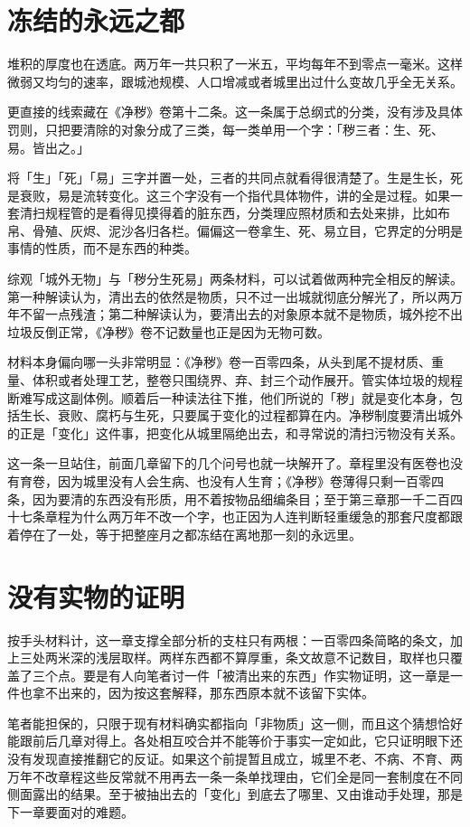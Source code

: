 \section{冻结的永远之都}

堆积的厚度也在透底。两万年一共只积了一米五，平均每年不到零点一毫米。这样微弱又均匀的速率，跟城池规模、人口增减或者城里出过什么变故几乎全无关系。

更直接的线索藏在《净秽》卷第十二条。这一条属于总纲式的分类，没有涉及具体罚则，只把要清除的对象分成了三类，每一类单用一个字：「秽三者：生、死、易。皆出之。」

将「生」「死」「易」三字并置一处，三者的共同点就看得很清楚了。生是生长，死是衰败，易是流转变化。这三个字没有一个指代具体物件，讲的全是过程。如果一套清扫规程管的是看得见摸得着的脏东西，分类理应照材质和去处来排，比如布帛、骨殖、灰烬、泥沙各归各栏。偏偏这一卷拿生、死、易立目，它界定的分明是事情的性质，而不是东西的种类。

综观「城外无物」与「秽分生死易」两条材料，可以试着做两种完全相反的解读。第一种解读认为，清出去的依然是物质，只不过一出城就彻底分解光了，所以两万年不留一点残渣；第二种解读认为，要清出去的对象原本就不是物质，城外挖不出垃圾反倒正常，《净秽》卷不记数量也正是因为无物可数。

材料本身偏向哪一头非常明显：《净秽》卷一百零四条，从头到尾不提材质、重量、体积或者处理工艺，整卷只围绕界、弃、封三个动作展开。管实体垃圾的规程断难写成这副体例。顺着后一种读法往下推，他们所说的「秽」就是变化本身，包括生长、衰败、腐朽与生死，只要属于变化的过程都算在内。净秽制度要清出城外的正是「变化」这件事，把变化从城里隔绝出去，和寻常说的清扫污物没有关系。

这一条一旦站住，前面几章留下的几个问号也就一块解开了。章程里没有医卷也没有育卷，因为城里没有人会生病、也没有人生育；《净秽》卷薄得只剩一百零四条，因为要清的东西没有形质，用不着按物品细编条目；至于第三章那一千二百四十七条章程为什么两万年不改一个字，也正因为人连判断轻重缓急的那套尺度都跟着停在了一处，等于把整座月之都冻结在离地那一刻的永远里。

\section{没有实物的证明}

按手头材料计，这一章支撑全部分析的支柱只有两根：一百零四条简略的条文，加上三处两米深的浅层取样。两样东西都不算厚重，条文故意不记数目，取样也只覆盖了三个点。要是有人向笔者讨一件「被清出来的东西」作实物证明，这一章是一件也拿不出来的，因为按这套解释，那东西原本就不该留下实体。

笔者能担保的，只限于现有材料确实都指向「非物质」这一侧，而且这个猜想恰好能跟前后几章对得上。各处相互咬合并不能等价于事实一定如此，它只证明眼下还没有发现直接推翻它的反证。如果这个前提暂且成立，城里不老、不病、不育、两万年不改章程这些反常就不用再去一条一条单找理由，它们全是同一套制度在不同侧面露出的结果。至于被抽出去的「变化」到底去了哪里、又由谁动手处理，那是下一章要面对的难题。
